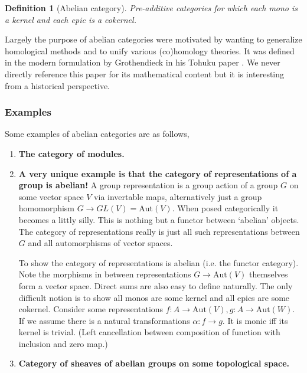 \documentclass[12pt]{article}
\numberwithin{equation}{section}
\newtheorem{definition}{Definition}[section]
\begin{document}
\begin{appendices}
	
	\begin{definition}[Abelian category]
		Pre-additive categories for which each mono is a kernel and each epic is a cokernel.
	\end{definition}
	Largely the purpose of abelian categories were motivated by wanting to generalize homological methods and to unify various (co)homology theories. It was defined in the modern formulation by Grothendieck in his Tohuku paper \cite{grothendieck1957quelques}. We never directly reference this paper for its mathematical content but it is interesting from a historical perspective.
	\subsubsection{Examples}
	Some examples of abelian categories are as follows,
	\begin{enumerate}
		\item \textbf{The category of modules.}
		\item\textbf{ A very unique example is that the category of representations of a group is abelian!} A group representation is a group action of a group $G$ on some vector space $V$ via invertable maps, alternatively just a group homomorphism $G\to GL(V)=\mathrm{Aut}(V)$. When posed categorically it becomes a littly silly. This is nothing but a functor between `abelian' objects. The category of representations really is just all such representations between $G$ and all automorphisms of vector spaces.
		
		To show the category of representations is abelian (i.e. the functor category). Note the morphisms in between representations $G \to \mathrm{Aut}(V)$ themselves form a vector space. Direct sums are also easy to define naturally. The only difficult notion is to show all monos are some kernel and all epics are some cokernel. Consider some representations $f: A \to \mathrm{Aut}(V), g: A \to \mathrm{Aut}(W)$. If we assume there is a natural transformations $\alpha: f \to g$. It is monic iff its kernel is trivial. (Left cancellation between composition of function with inclusion and zero map.)	
		\item \textbf{Category of sheaves of abelian groups on some topological space.}
		

\end{enumerate}
\end{appendices}
\end{document}
